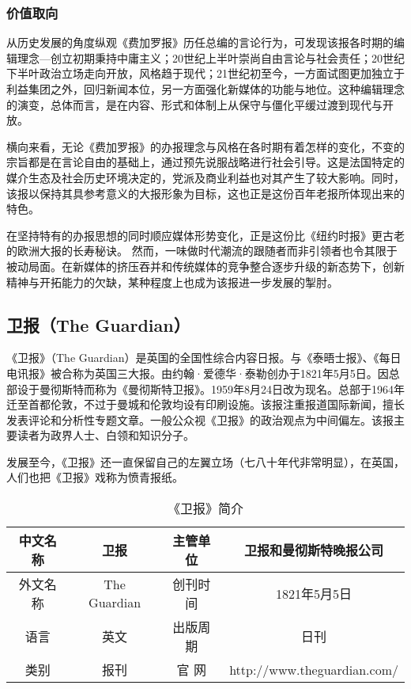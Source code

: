 \documentclass[a4paper,openany]{book}
\begin{document}
\subsubsection{价值取向}

从历史发展的角度纵观《费加罗报》历任总编的言论行为，可发现该报各时期的编辑理念—创立初期秉持中庸主义；20世纪上半叶崇尚自由言论与社会责任；20世纪下半叶政治立场走向开放，风格趋于现代；21世纪初至今，一方面试图更加独立于利益集团之外，回归新闻本位，另一方面强化新媒体的功能与地位。这种编辑理念的演变，总体而言，是在内容、形式和体制上从保守与僵化平缓过渡到现代与开放。

横向来看，无论《费加罗报》的办报理念与风格在各时期有着怎样的变化，不变的宗旨都是在言论自由的基础上，通过预先说服战略进行社会引导。这是法国特定的媒介生态及社会历史环境决定的，党派及商业利益也对其产生了较大影响。同时，该报以保持其具参考意义的大报形象为目标，这也正是这份百年老报所体现出来的特色。

在坚持特有的办报思想的同时顺应媒体形势变化，正是这份比《纽约时报》更古老的欧洲大报的长寿秘诀。
然而，一味做时代潮流的跟随者而非引领者也令其限于被动局面。在新媒体的挤压吞并和传统媒体的竞争整合逐步升级的新态势下，创新精神与开拓能力的欠缺，某种程度上也成为该报进一步发展的掣肘。

\subsection{卫报（The Guardian）}

《卫报》（The Guardian）是英国的全国性综合内容日报。与《泰晤士报》、《每日电讯报》被合称为英国三大报。由约翰·爱德华·泰勒创办于1821年5月5日。因总部设于曼彻斯特而称为《曼彻斯特卫报》。1959年8月24日改为现名。总部于1964年迁至首都伦敦，不过于曼城和伦敦均设有印刷设施。该报注重报道国际新闻，擅长发表评论和分析性专题文章。一般公众视《卫报》的政治观点为中间偏左。该报主要读者为政界人士、白领和知识分子。

发展至今，《卫报》还一直保留自己的左翼立场（七八十年代非常明显），在英国，人们也把《卫报》戏称为愤青报纸。

\begin{table}[ht]
\centering
\setlength{\belowcaptionskip}{5pt}
\caption{《卫报》简介}
\begin{tabular}{|c|c|c|c|}
\hline
中文名称 & 卫报          & 主管单位   & 卫报和曼彻斯特晚报公司                 \\ \hline
外文名称 & The Guardian & 创刊时间   & 1821年5月5日                   \\ \hline
语言   & 英文          & 出版周期   & 日刊                          \\ \hline
类别   & 报刊          & 官    网 & http://www.theguardian.com/ \\ \hline
\end{tabular}
\end{table}
\end{document}
